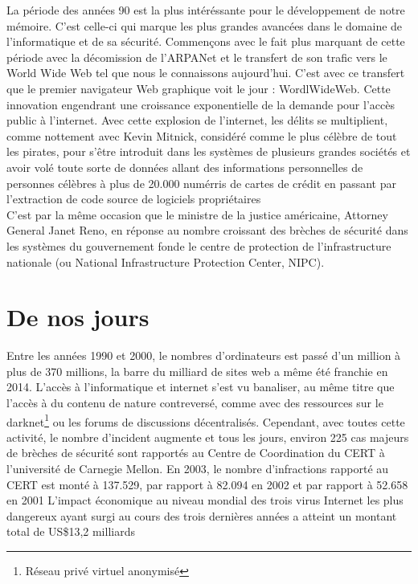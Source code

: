 \documentclass[a4paper]{memoir}
\begin{document}
La période des années 90 est la plus intéréssante pour le développement de notre mémoire. C'est celle-ci qui marque les plus grandes avancées dans le domaine de l'informatique et de sa sécurité.
Commençons avec le fait plus marquant de cette période avec la décomission de l'ARPANet et le transfert de son trafic vers le World Wide Web tel que nous le connaissons aujourd'hui. C'est avec ce transfert que le premier navigateur Web graphique voit le jour : WordlWideWeb. Cette innovation engendrant une croissance exponentielle de la demande pour l'accès public à l'internet. Avec cette explosion de l'internet, les délits se multiplient, comme nottement avec Kevin Mitnick, considéré comme le plus célèbre de tout les pirates, pour s'être introduit dans les systèmes de plusieurs grandes sociétés et avoir volé toute sorte de données allant des informations personnelles de personnes célèbres à plus de 20.000 numérris de cartes de crédit en passant par l'extraction de code source de logiciels propriétaires \\
\noindent C'est par la même occasion que le ministre de la justice américaine, Attorney General Janet Reno, en réponse au nombre croissant des brèches de sécurité dans les systèmes du gouvernement fonde le centre de protection de l'infrastructure nationale (ou National Infrastructure Protection Center, NIPC).


\section{De nos jours}

Entre les années 1990 et 2000, le nombres d'ordinateurs est passé d'un million à plus de 370 millions, la barre du milliard de sites web a même été franchie en 2014. L'accès à l'informatique et internet s'est vu banaliser, au même titre que l'accès à du contenu de nature contreversé, comme avec des ressources sur le darknet\footnote{Réseau privé virtuel anonymisé} ou les forums de discussions décentralisés.
Cependant, avec toutes cette activité, le nombre d'incident augmente et tous les jours, environ 225 cas majeurs de brèches de sécurité sont rapportés au Centre de Coordination du CERT à l'université de Carnegie Mellon.
En 2003, le nombre d'infractions rapporté au CERT est monté à 137.529, par rapport à 82.094 en 2002 et par rapport à 52.658 en 2001
L'impact économique au niveau mondial des trois virus Internet les plus dangereux ayant surgi au cours des trois dernières années a atteint un montant total de US\$13,2 milliards\\
\end{document}
